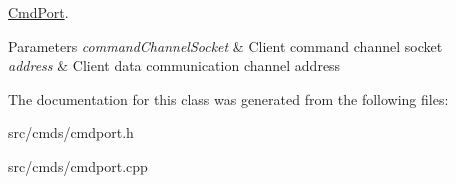 \hyperlink{classCmdPort}{Cmd\+Port}. 


\begin{DoxyParams}{Parameters}
{\em command\+Channel\+Socket} & Client command channel socket \\
\hline
{\em address} & Client data communication channel address \\
\hline
\end{DoxyParams}


The documentation for this class was generated from the following files\+:\begin{DoxyCompactItemize}
\item 
src/cmds/cmdport.\+h\item 
src/cmds/cmdport.\+cpp\end{DoxyCompactItemize}
